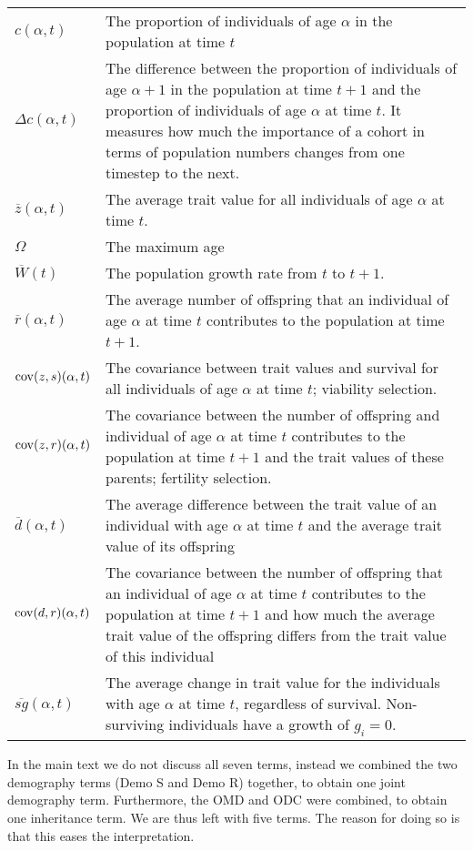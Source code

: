 \begin{tabular}{l p{}}
$c(\alpha,t)$ & The proportion of individuals of age $\alpha$ in the population at time $t$ \\
$\Delta c(\alpha,t)$ & The difference between the proportion of individuals of age $\alpha+1$ in the population at time $t+1$ and the proportion of individuals of age $\alpha$ at time $t$. It measures how much the importance of a cohort in terms of population numbers changes from one timestep to the next.  \\
$\overline{z}(\alpha,t)$ & The average trait value for all individuals of age $\alpha$ at time $t$.\\
$\Omega$ & The maximum age\\
$\overline{W}(t)$ & The population growth rate from $t$ to $t+1$.\\
$\overline{r}(\alpha,t)$ & The average number of offspring that an individual of age $\alpha$ at time $t$ contributes to the population at time $t+1$.\\
$\mathrm{cov}(z,s)(\alpha,t)$ & The covariance between trait values and survival for all individuals of age $\alpha$ at time $t$; viability selection. \\
$\mathrm{cov}(z,r)(\alpha,t)$ & The covariance between the number of offspring and individual of age $\alpha$ at time $t$ contributes to the population at time $t+1$ and the trait values of these parents; fertility selection.\\
$\overline{d}(\alpha,t)$ & The average difference between the trait value of an individual with age $\alpha$ at time $t$ and the average trait value of its offspring  \\
$\mathrm{cov}(d,r)(\alpha,t)$ & The covariance between the number of offspring that an individual of age $\alpha$ at time $t$ contributes to the population at time $t+1$ and how much the average trait value of the offspring differs from the trait value of this individual \\
$\overline{sg}(\alpha,t)$ & The average change in trait value for the individuals with age $\alpha$ at time $t$, regardless of survival. Non-surviving individuals have a growth of $g_i=0$.\\
\end{tabular}
In the main text we do not discuss all seven terms, instead we combined the two demography terms (Demo S and Demo R) together, to obtain one joint demography term. Furthermore, the OMD and ODC were combined, to obtain one inheritance term. We are thus left with five terms. The reason for doing so is that this eases the interpretation.

